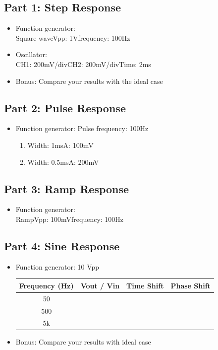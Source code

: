 \documentclass[a4paper]{article}
\begin{document}
\subsection*{Part 1: Step Response}
\begin{itemize}
	\item Function generator:\\
	Square wave\qquad Vpp: 1V\qquad frequency: 100Hz
	\item Oscillator:\\
	CH1: 200mV/div\qquad CH2: 200mV/div\qquad Time: 2ms
	\item Bonus: Compare your results with the ideal case
\end{itemize}
\subsection*{Part 2: Pulse Response}
\begin{itemize}
	\item Function generator: Pulse frequency: 100Hz
	\begin{enumerate}
		\item Width: 1ms\qquad A: 100mV
		\item Width: 0.5ms\qquad A: 200mV
	\end{enumerate}
\end{itemize}
\subsection*{Part 3: Ramp Response}
\begin{itemize}
	\item Function generator:\\
	Ramp\qquad Vpp: 100mV\qquad frequency: 100Hz
\end{itemize}
\subsection*{Part 4: Sine Response}
\begin{itemize}
	\item Function generator: 10 Vpp
	\begin{table}[H]
		\centering
		\begin{tabular}{|c|c|c|c|}
			\hline
			Frequency (Hz) & Vout / Vin & Time Shift & Phase Shift \\
			\hline
			50 &&&\\
			\hline
			500 &&&\\
			\hline
			5k &&&\\
			\hline
		\end{tabular}
	\end{table}
	\item Bonus: Compare your results with ideal case
\end{itemize}
\end{document}
